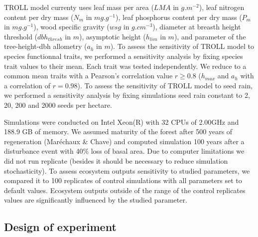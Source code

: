 \documentclass[12pt,]{article}
\theoremstyle{definition}
\theoremstyle{definition}
\theoremstyle{remark}
\begin{document}
TROLL model currenty uses leaf mass per area (\(LMA\) in \(g.m^{-2}\)),
leaf nitrogen content per dry mass (\(N_m\) in \(mg.g^{-1}\)), leaf
phosphorus content per dry mass (\(P_m\) in \(mg.g^{-1}\)), wood
specific gravity (\(wsg\) in \(g.cm^{-3}\)), diameter at breasth height
threshold (\(dbh_{thresh}\) in \(m\)), asymptotic height (\(h_{lim}\) in
\(m\)), and parameter of the tree-height-dbh allometry (\(a_h\) in
\(m\)). To assess the sensitivity of TROLL model to species functionnal
traits, we performed a sensitivity analysis by fixing species trait
values to their mean. Each trait was tested independently. We reduce to
a common mean traits with a Pearson's correlation value \(r \geq 0.8\)
(\(h_{max}\) and \(a_h\) with a correlation of \(r=0.98\)). To assess
the sensitivity of TROLL model to seed rain, we performed a sensitivity
analysis by fixing simulations seed rain constant to 2, 20, 200 and 2000
seeds per hectare.

Simulations were conducted on Intel Xeon(R) with 32 CPUs of 2.00GHz and
188.9 GB of memory. We assumed maturity of the forest after 500 years of
regeneration (Maréchaux \& Chave) and computed simulation 100 years
after a disturbance event with 40\% loss of basal area. Due to computer
limitations we did not run replicate (besides it should be necessary to
reduce simulation stochasticity). To assess ecosystem outputs
sensitivity to studied parameters, we compared it to 100 replicates of
control simulations with all parameters set to default values. Ecosystem
outputs outside of the range of the control replicates values are
significantly influenced by the studied parameter.

\subsection{Design of experiment}\label{design-of-experiment}
\end{document}
